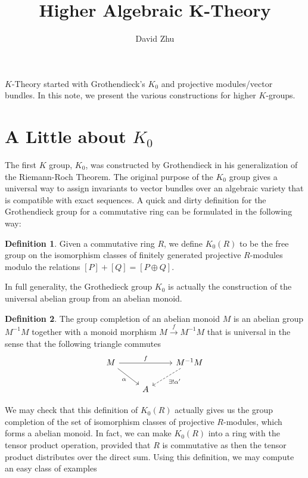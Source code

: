 \documentclass{article}
\title{Higher Algebraic K-Theory}
\author{David Zhu}
\theoremstyle{definition}
\theoremstyle{definition}
\newtheorem{definition}{Definition}[theorem]
\theoremstyle{definition}
\theoremstyle{definition}
\theoremstyle{definition}
\theoremstyle{definition}
\theoremstyle{definition}
\begin{document}
\maketitle
$K$-Theory started with Grothendieck's $K_0$ and projective modules/vector bundles. In this note, we present the various constructions for higher $K$-groups.
\section{A Little about $K_0$}
The first $K$ group, $K_0$, was constructed by Grothendieck in his generalization of the Riemann-Roch Theorem. The original purpose of the $K_0$ group gives a universal way to assign invariants to vector bundles over an algebraic variety that is compatible with exact sequences. A quick and dirty definition for the Grothendieck group for a commutative ring can be formulated in the following way:


\begin{tcolorbox}[colback=purple!5!white,colframe=purple!75!black]
\begin{definition}
    Given a commutative ring $R$, we define $K_0(R)$ to be the free group on the isomorphism classes of finitely generated projective $R$-modules modulo the relations $[P]+[Q]=[P\oplus Q]$.
\end{definition}
\end{tcolorbox}

In full generality, the Grothedieck group $K_0$ is actually the construction of the universal abelian group from an abelian monoid.


\begin{tcolorbox}[colback=purple!5!white,colframe=purple!75!black]
\begin{definition}
    The group completion of an abelian monoid $M$ is an abelian group $M^{-1}M$ together with a monoid morphism $M\xrightarrow{f}M^{-1}M$ that is universal in the sense that the following triangle commutes 
    \[
\begin{tikzcd}
M\arrow[rr,"f"]\arrow[dr,swap,"\alpha"]&&M^{-1}M\arrow[dl,dashrightarrow,"\exists !\alpha'"]\\
&A
\end{tikzcd}
\]
\end{definition}
\end{tcolorbox}



We may check that this definition of $K_0(R)$ actually gives us the group completion of the set of isomorphism classes of projective $R$-modules, which forms a abelian monoid. In fact, we can make $K_0(R)$ into a ring with the tensor product operation, provided that $R$ is commutative as then the tensor product distributes over the direct sum. Using this definition, we may compute an easy class of examples
\end{document}
